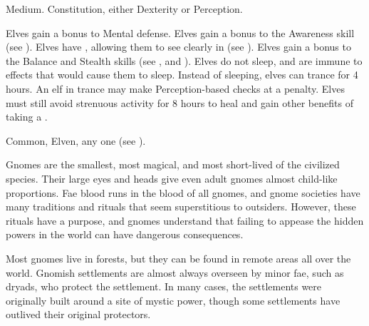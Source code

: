    Medium.
    Constitution, either  Dexterity or  Perception.
  \begin{raggeditemize}
     Elves gain a  bonus to Mental defense.
     Elves gain a  bonus to the Awareness skill (see ).
     Elves have , allowing them to see clearly in  (see ).
     Elves gain a  bonus to the Balance and Stealth skills (see , and ).
     Elves do not sleep, and are immune to \magical effects that would cause them to sleep.
      Instead of sleeping, elves can trance for 4 hours.
      An elf in trance may make Perception-based checks at a  penalty.
      Elves must still avoid strenuous activity for 8 hours to heal and gain other benefits of taking a .
  \end{raggeditemize}
   Common, Elven, any one  (see ).


  Gnomes are the smallest, most magical, and most short-lived of the civilized species.
  Their large eyes and heads give even adult gnomes almost child-like proportions.
  Fae blood runs in the blood of all gnomes, and gnome societies have many traditions and rituals that seem superstitious to outsiders.
  However, these rituals have a purpose, and gnomes understand that failing to appease the hidden powers in the world can have dangerous consequences.

  Most gnomes live in forests, but they can be found in remote areas all over the world.
  Gnomish settlements are almost always overseen by minor fae, such as dryads, who protect the settlement.
  In many cases, the settlements were originally built around a site of mystic power, though some settlements have outlived their original protectors.


